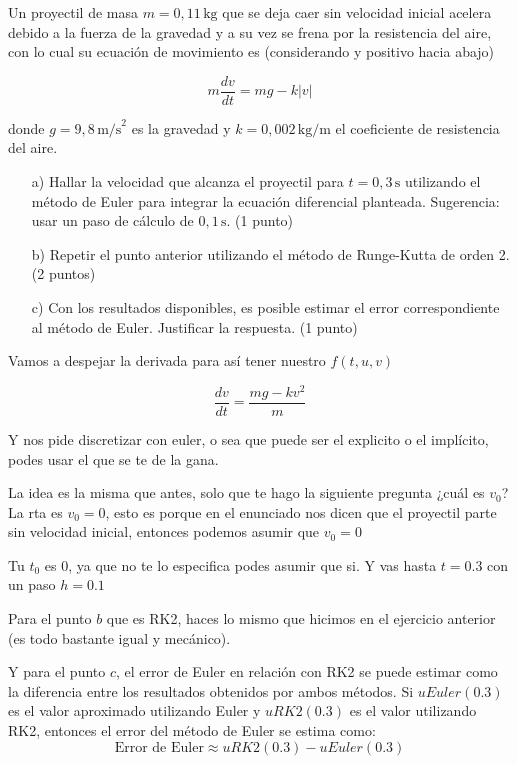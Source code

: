 Un proyectil de masa \(m = 0,11 \, \text{kg}\) que se deja caer sin velocidad inicial acelera debido a la fuerza de la gravedad y a su vez se frena por la resistencia del aire, con lo cual su ecuación de movimiento es (considerando y positivo hacia abajo)

\[
m \frac{dv}{dt} = mg - k|v|
\]

donde \(g = 9,8 \, \text{m/s}^2\) es la gravedad y \(k = 0,002 \, \text{kg/m}\) el coeficiente de resistencia del aire.

\begin{enumerate}
    \item[a)] Hallar la velocidad que alcanza el proyectil para \(t = 0,3 \, \text{s}\) utilizando el método de Euler para integrar la ecuación diferencial planteada. Sugerencia: usar un paso de cálculo de \(0,1 \, \text{s}\). (1 punto)
    \item[b)] Repetir el punto anterior utilizando el método de Runge-Kutta de orden 2. (2 puntos)
    \item[c)] Con los resultados disponibles, es posible estimar el error correspondiente al método de Euler. Justificar la respuesta. (1 punto)
\end{enumerate}



Vamos a despejar la derivada para así tener nuestro $f(t,u,v)$

$$ \frac{dv}{dt} = \frac{mg - kv^2}{m}$$


Y nos pide discretizar con euler, o sea que puede ser el explicito o el implícito, podes usar el que se te de la gana. 

La idea es la misma que antes, solo que te hago la siguiente pregunta  ¿cuál es $v_0$? La rta es $v_0 = 0$, esto es porque en el enunciado nos dicen que el proyectil parte sin velocidad inicial, entonces podemos asumir que $v_0 = 0$

Tu $t_0$ es 0, ya que no te lo especifica podes asumir que si. Y vas hasta $t = 0.3$ con un paso $h = 0.1$

Para el punto $b$ que es RK2, haces lo mismo que hicimos en el ejercicio anterior (es todo bastante igual y mecánico).

Y para el punto $c$, el error de Euler en relación con RK2 se puede estimar como la diferencia entre los resultados obtenidos por ambos métodos. Si $uEuler(0.3)$ es el valor aproximado utilizando Euler y $uRK2(0.3)$ es el valor utilizando RK2, entonces el error del método de Euler se estima como:
$$\text{Error de Euler} \approx uRK2(0.3)-uEuler(0.3)$$

